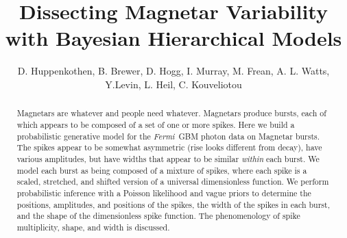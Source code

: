 \documentclass[12pt]{emulateapj}
\newcommand{\project}[1]{\textsl{#1}}
\newcommand{\Fermi}{\project{Fermi}}
\begin{document}
\title{Dissecting Magnetar Variability with Bayesian Hierarchical Models}

\author{D. Huppenkothen, B. Brewer\altaffilmark{}, D. Hogg\altaffilmark{}, I. Murray\altaffilmark{}, M. Frean\altaffilmark{}, A. L. Watts, Y.Levin\altaffilmark{},  L. Heil, C. Kouveliotou}

 




\begin{abstract}
Magnetars are whatever and people need whatever.
Magnetars produce bursts,
  each of which appears to be composed of a set of one or more spikes.
Here we build a probabilistic generative model for the \Fermi\ GBM photon data on Magnetar bursts.
The spikes appear to be somewhat asymmetric
  (rise looks different from decay),
  have various amplitudes,
  but have widths that appear to be similar \emph{within} each burst.
We model each burst as being composed of a mixture of spikes,
  where each spike is a scaled, stretched, and shifted version of a universal dimensionless function.
We perform probabilistic inference with a Poisson likelihood and vague priors to determine
  the positions, amplitudes, and positions of the spikes,
  the width of the spikes in each burst,
  and the shape of the dimensionless spike function.
The phenomenology of spike multiplicity, shape, and width is discussed.
\end{abstract}

\end{document}
